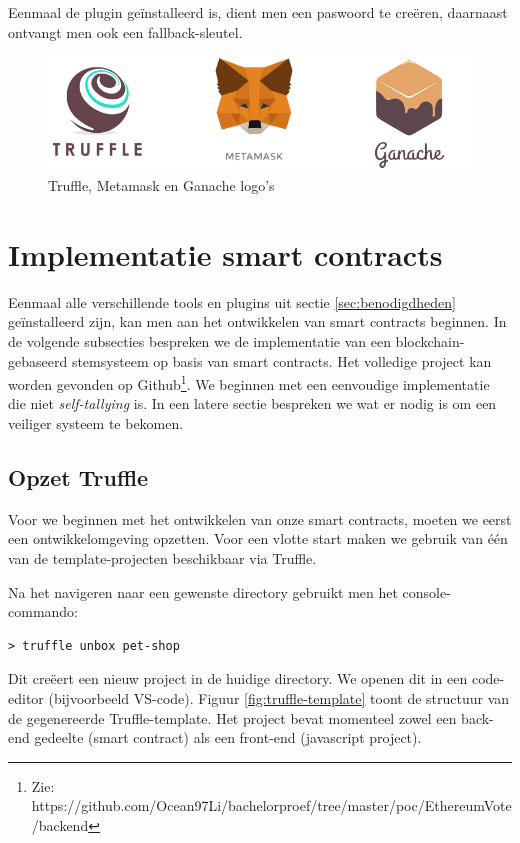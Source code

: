 	Eenmaal de plugin geïnstalleerd is, dient men een paswoord te creëren, daarnaast ontvangt men ook een fallback-sleutel.
	
	\begin{figure}
		\includegraphics[width=\linewidth]{img/metamask-truffle-ganache.png}
		\caption{Truffle, Metamask en Ganache logo's}
		\label{fig:metamask-truffle-ganache}
	\end{figure}
	\newpage
\section{Implementatie smart contracts}
	Eenmaal alle verschillende tools en plugins uit sectie \ref{sec:benodigdheden} geïnstalleerd zijn, kan men aan het ontwikkelen van smart contracts beginnen. In de volgende subsecties bespreken we de implementatie van een blockchain-gebaseerd stemsysteem op basis van smart contracts. Het volledige project kan worden gevonden op Github\footnote{Zie: https://github.com/Ocean97Li/bachelorproef/tree/master/poc/EthereumVote/backend}. We beginnen met een eenvoudige implementatie die niet \textit{self-tallying} is. In een latere sectie bespreken we wat er nodig is om een veiliger systeem te bekomen.
	\subsection{Opzet Truffle}
	Voor we beginnen met het ontwikkelen van onze smart contracts, moeten we eerst een ontwikkelomgeving opzetten. Voor een vlotte start maken we gebruik van één van de template-projecten beschikbaar via Truffle. 
	
	Na het navigeren naar een gewenste directory gebruikt men het console-commando: 
	 \lstset{language=bash}
	\begin{lstlisting}[numbers=none]
	> truffle unbox pet-shop
	\end{lstlisting}
	
	Dit creëert een nieuw project in de huidige directory. We openen dit in een code-editor (bijvoorbeeld VS-code). Figuur \ref{fig:truffle-template} toont de structuur van de gegenereerde Truffle-template. Het project bevat momenteel zowel een back-end gedeelte (smart contract) als een front-end (javascript project). 
	
